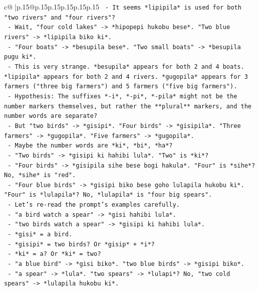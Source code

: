 \documentclass{article}
\begin{document}
{\begin{supertabular}{c@{$\;$}|p{.15\linewidth}@{}p{.15\linewidth}p{.15\linewidth}p{.15\linewidth}p{.15\linewidth}p{.15\linewidth}}
{{{\texttt{          {-} It seems *lipipila* is used for both "two rivers" and "four rivers"?} \\
\texttt{          {-} Wait, "four cold lakes" {-}> *hipopepi hukobu bese*. "Two blue rivers" {-}> *lipipila biko ki*.} \\
\texttt{          {-} "Four boats" {-}> *besupila bese*. "Two small boats" {-}> *besupila pugu ki*.} \\
\texttt{          {-} This is very strange. *besupila* appears for both 2 and 4 boats. *lipipila* appears for both 2 and 4 rivers. *gugopila* appears for 3 farmers ("three big farmers") and 5 farmers ("five big farmers").} \\
\texttt{          {-} Hypothesis: The suffixes *{-}i*, *{-}pi*, *{-}pila* might not be the number markers themselves, but rather the **plural** markers, and the number words are separate?} \\
\texttt{          {-} But "two birds" {-}> *gisipi*. "Four birds" {-}> *gisipila*. "Three farmers" {-}> *gugopila*. "Five farmers" {-}> *gugopila*.} \\
\texttt{          {-} Maybe the number words are *ki*, *bi*, *ha*?} \\
\texttt{          {-} "Two birds" {-}> *gisipi ki hahibi lula*. "Two" is *ki*?} \\
\texttt{          {-} "Four birds" {-}> *gisipila sihe bese bogi hakula*. "Four" is *sihe*? No, *sihe* is "red".} \\
\texttt{          {-} "Four blue birds" {-}> *gisipi biko bese goho lulapila hukobu ki*. "Four" is *lulapila*? No, *lulapila* is "four big spears".} \\
\texttt{          {-} Let's re{-}read the prompt's examples carefully.} \\
\texttt{          {-} "a bird watch a spear" {-}> *gisi hahibi lula*.} \\
\texttt{          {-} "two birds watch a spear" {-}> *gisipi ki hahibi lula*.} \\
\texttt{            {-} *gisi* = a bird.} \\
\texttt{            {-} *gisipi* = two birds? Or *gisip* + *i*?} \\
\texttt{            {-} *ki* = a? Or *ki* = two?} \\
\texttt{            {-} "a blue bird" {-}> *gisi biko*. "two blue birds" {-}> *gisipi biko*.} \\
\texttt{            {-} "a spear" {-}> *lula*. "two spears" {-}> *lulapi*? No, "two cold spears" {-}> *lulapila hukobu ki*.} \\
}}}
\end{supertabular}}
\end{document}
